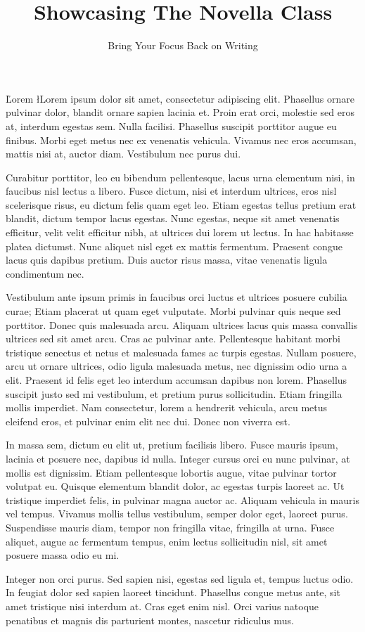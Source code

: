\documentclass{novella}
\title     {Showcasing The Novella Class}
\subtitle  {Bring Your Focus Back on Writing}
\begin{document}
\h{Lorem}
\l{L}orem ipsum dolor sit amet, consectetur adipiscing elit. Phasellus ornare pulvinar dolor, blandit ornare sapien lacinia et. Proin erat orci, molestie sed eros at, interdum egestas sem. Nulla facilisi. Phasellus suscipit porttitor augue eu finibus. Morbi eget metus nec ex venenatis vehicula. Vivamus nec eros accumsan, mattis nisi at, auctor diam. Vestibulum nec purus dui.

Curabitur porttitor, leo eu bibendum pellentesque, lacus urna elementum nisi, in faucibus nisl lectus a libero. Fusce dictum, nisi et interdum ultrices, eros nisl scelerisque risus, eu dictum felis quam eget leo. Etiam egestas tellus pretium erat blandit, dictum tempor lacus egestas. Nunc egestas, neque sit amet venenatis efficitur, velit velit efficitur nibh, at ultrices dui lorem ut lectus. In hac habitasse platea dictumst. Nunc aliquet nisl eget ex mattis fermentum. Praesent congue lacus quis dapibus pretium. Duis auctor risus massa, vitae venenatis ligula condimentum nec.

Vestibulum ante ipsum primis in faucibus orci luctus et ultrices posuere cubilia curae; Etiam placerat ut quam eget vulputate. Morbi pulvinar quis neque sed porttitor. Donec quis malesuada arcu. Aliquam ultrices lacus quis massa convallis ultrices sed sit amet arcu. Cras ac pulvinar ante. Pellentesque habitant morbi tristique senectus et netus et malesuada fames ac turpis egestas. Nullam posuere, arcu ut ornare ultrices, odio ligula malesuada metus, nec dignissim odio urna a elit. Praesent id felis eget leo interdum accumsan dapibus non lorem. Phasellus suscipit justo sed mi vestibulum, et pretium purus sollicitudin. Etiam fringilla mollis imperdiet. Nam consectetur, lorem a hendrerit vehicula, arcu metus eleifend eros, et pulvinar enim elit nec dui. Donec non viverra est.

In massa sem, dictum eu elit ut, pretium facilisis libero. Fusce mauris ipsum, lacinia et posuere nec, dapibus id nulla. Integer cursus orci eu nunc pulvinar, at mollis est dignissim. Etiam pellentesque lobortis augue, vitae pulvinar tortor volutpat eu. Quisque elementum blandit dolor, ac egestas turpis laoreet ac. Ut tristique imperdiet felis, in pulvinar magna auctor ac. Aliquam vehicula in mauris vel tempus. Vivamus mollis tellus vestibulum, semper dolor eget, laoreet purus. Suspendisse mauris diam, tempor non fringilla vitae, fringilla at urna. Fusce aliquet, augue ac fermentum tempus, enim lectus sollicitudin nisl, sit amet posuere massa odio eu mi.

Integer non orci purus. Sed sapien nisi, egestas sed ligula et, tempus luctus odio. In feugiat dolor sed sapien laoreet tincidunt. Phasellus congue metus ante, sit amet tristique nisi interdum at. Cras eget enim nisl. Orci varius natoque penatibus et magnis dis parturient montes, nascetur ridiculus mus.
\end{document}
